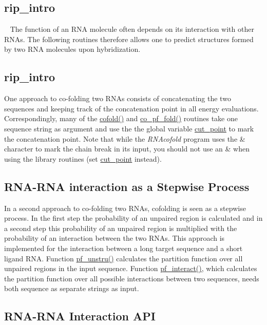 \hypertarget{rip_rip_intro}{}\subsection{rip\+\_\+intro}\label{rip_rip_intro}
~\newline
 The function of an R\+NA molecule often depends on its interaction with other R\+N\+As. The following routines therefore allows one to predict structures formed by two R\+NA molecules upon hybridization.\hypertarget{rip_rip_intro}{}\subsection{rip\+\_\+intro}\label{rip_rip_intro}
One approach to co-\/folding two R\+N\+As consists of concatenating the two sequences and keeping track of the concatenation point in all energy evaluations. Correspondingly, many of the \mbox{\hyperlink{group__mfe__cofold_gabc8517f22cfe70595ee81fc837910d52}{cofold()}} and \mbox{\hyperlink{part__func__co_8h_ae5c1e7331718669bdae7a86de2be6184}{co\+\_\+pf\+\_\+fold()}} routines take one sequence string as argument and use the the global variable \mbox{\hyperlink{fold__vars_8h_ab9b2c3a37a5516614c06d0ab54b97cda}{cut\+\_\+point}} to mark the concatenation point. Note that while the {\itshape R\+N\+Acofold} program uses the \textquotesingle{}\&\textquotesingle{} character to mark the chain break in its input, you should not use an \textquotesingle{}\&\textquotesingle{} when using the library routines (set \mbox{\hyperlink{fold__vars_8h_ab9b2c3a37a5516614c06d0ab54b97cda}{cut\+\_\+point}} instead).\hypertarget{rip_rip_stepwise}{}\subsection{R\+N\+A-\/\+R\+N\+A interaction as a Stepwise Process}\label{rip_rip_stepwise}
In a second approach to co-\/folding two R\+N\+As, cofolding is seen as a stepwise process. In the first step the probability of an unpaired region is calculated and in a second step this probability of an unpaired region is multiplied with the probability of an interaction between the two R\+N\+As. This approach is implemented for the interaction between a long target sequence and a short ligand R\+NA. Function \mbox{\hyperlink{group__up__cofold_ga5b4ee40e190d2f633cd01cf0d2fe93cf}{pf\+\_\+unstru()}} calculates the partition function over all unpaired regions in the input sequence. Function \mbox{\hyperlink{group__up__cofold_ga1aa0aa02bc3a724f87360c03097afd00}{pf\+\_\+interact()}}, which calculates the partition function over all possible interactions between two sequences, needs both sequence as separate strings as input.\hypertarget{rip_rip_api}{}\subsection{R\+N\+A-\/\+R\+N\+A Interaction A\+PI}\label{rip_rip_api}

